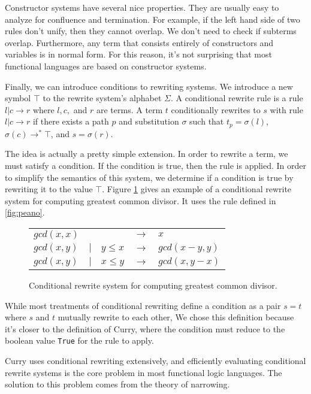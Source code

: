 \documentclass{book}
\theoremstyle{definition}
\begin{document}
Constructor systems have several nice properties.
They are usually easy to analyze for confluence and termination.
For example, if the left hand side of two rules don't unify, then they cannot overlap.
We don't need to check if subterms overlap.
Furthermore, any term that consists entirely of constructors and variables is in normal form.
For this reason, it's not surprising that most functional languages are based on constructor systems.

Finally, we can introduce conditions to rewriting systems.
We introduce a new symbol $\top$ to the rewrite system's alphabet $\Sigma$.
A conditional rewrite rule is a rule $l \vert c \to r$ where $l,c,$ and $r$ are terms.
A term $t$ conditionally rewrites to $s$ with rule $l \vert c \to r$ if
there exists a path $p$ and substitution $\sigma$ such that 
$t_p = \sigma(l)$, $\sigma(c) \to^* \top$, and $s = \sigma(r)$.

The idea is actually a pretty simple extension.
In order to rewrite a term, we must satisfy a condition.
If the condition is true, then the rule is applied.
In order to simplify the semantics of this system,
we determine if a condition is true by rewriting it to the value $\top$.
Figure \ref{fig:gcd} gives an example of a conditional rewrite system for computing
greatest common divisor.  It uses the rule defined in \ref{fig:peano}.

\begin{figure}
    \begin{tabular}{lllcl}
        $gcd(x,x)$ &         &           & $\to$ & $x$ \\
        $gcd(x,y)$ & $\vert$ & $y \le x$ & $\to$ & $gcd(x-y,y)$ \\
        $gcd(x,y)$ & $\vert$ & $x \le y$ & $\to$ & $gcd(x,y-x)$ \\
    \end{tabular}
    \caption{Conditional rewrite system for computing greatest common divisor.}
    \label{fig:gcd}
\end{figure}

While most treatments of conditional rewriting \cite{IntegrationFunLog,condKaplan}
define a condition as a pair $s = t$ where $s$ and $t$ mutually rewrite to each other,
We chose this definition because it's closer to the definition of Curry,
where the condition must reduce to the boolean value \texttt{True} for the rule to apply.

Curry uses conditional rewriting extensively,
and efficiently evaluating conditional rewrite systems 
is the core problem in most functional logic languages.
The solution to this problem comes from the theory of narrowing.
\end{document}
